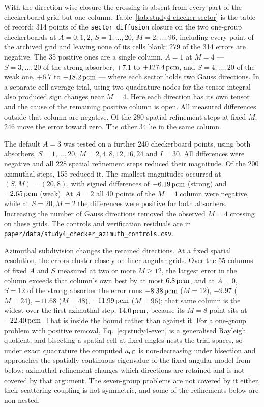 With the direction-wise closure the crossing is absent from every part of the
checkerboard grid but one column. Table~\ref{tab:study4-checker-sector} is the table
of record: 314 points of the \texttt{sector\_diffusion} closure on the two one-group
checkerboards at $A{=}0,1,2$, $S{=}1,\ldots,20$, $M{=}2,\ldots,96$, including every
point of the archived grid and leaving none of its cells blank; 279 of the 314 errors
are negative. The 35 positive ones are a single column, $A{=}1$ at $M{=}4$ ---
$S{=}3,\ldots,20$ of the strong absorber, $+7.1$ to $+127.4\,\mathrm{pcm}$, and
$S{=}4,\ldots,20$ of the weak one, $+6.7$ to $+18.2\,\mathrm{pcm}$ --- where each sector
holds two Gauss directions. In a separate cell-average trial, using two quadrature
nodes for the tensor integral also produced sign changes near $M{=}4$. Here each
direction has its own tensor and the cause of the remaining positive column is open.
All measured differences outside that column are negative. Of the 280 spatial
refinement steps at fixed $M$, 246 move the error toward zero. The other 34 lie
in the same column.

The default $A{=}3$ was tested on a further 240 checkerboard points, using both
absorbers, $S{=}1,\ldots,20$, $M{=}2,4,8,12,16,24$ and $I{=}30$. All differences
were negative and all 228 spatial refinement steps reduced their magnitude. Of
the 200 azimuthal steps, 155 reduced it. The smallest magnitudes occurred at
$(S,M)=(20,8)$, with signed differences of $-6.19\,\mathrm{pcm}$ (strong) and $-2.65\,\mathrm{pcm}$
(weak). At $A{=}2$ all 40 points of the $M{=}4$ column were negative, while at
$S{=}20,M{=}2$ the differences were positive for both absorbers. Increasing the
number of Gauss directions removed the observed $M{=}4$ crossing on these grids.
The controls and verification residuals are in
\texttt{paper/data/study4\_checker\_azimuth\_controls.csv}.

Azimuthal subdivision changes the retained directions. At a fixed spatial resolution,
the errors cluster closely on finer angular grids. Over the 55 columns of
fixed $A$ and $S$ measured at two or more $M\ge12$, the largest error in the column
exceeds that column's own best by at most $6.8\,\mathrm{pcm}$, and at $A{=}0$, $S{=}12$ of the
strong absorber the
error runs $-8.38\,\mathrm{pcm}$ ($M{=}12$), $-9.97$ ($M{=}24$), $-11.68$ ($M{=}48$),
$-11.99\,\mathrm{pcm}$ ($M{=}96$); that same column is the widest over the first azimuthal step,
$14.0\,\mathrm{pcm}$, because its $M{=}8$ point sits at $-22.40\,\mathrm{pcm}$. That is inside the bound
rather than against it. For a
one-group problem with positive removal, Eq.~\eqref{eq:study4-even} is a generalised
Rayleigh quotient, and bisecting a spatial cell at fixed angles nests the trial spaces,
so under exact quadrature the computed $\kappa_{\mathrm{eff}}$ is non-decreasing under bisection and
approaches the spatially continuous eigenvalue of the fixed angular model from below;
azimuthal refinement changes which directions are
retained and is not covered by that argument. The seven-group problems are not covered
by it either, their scattering coupling is not symmetric, and some of the refinements
below are non-nested.

